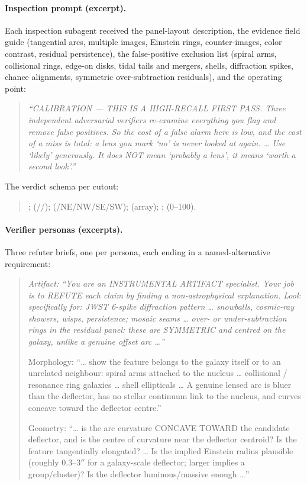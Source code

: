 \documentclass[11pt,letterpaper]{article}
\begin{document}
\paragraph{Inspection prompt (excerpt).} Each inspection subagent received
the panel-layout description, the evidence field guide (tangential arcs,
multiple images, Einstein rings, counter-images, color contrast, residual
persistence), the false-positive exclusion list (spiral arms, collisional
rings, edge-on disks, tidal tails and mergers, shells, diffraction spikes,
chance alignments, symmetric over-subtraction residuals), and the operating
point:
\begin{quote}\small\itshape
``CALIBRATION --- THIS IS A HIGH-RECALL FIRST PASS. Three independent
adversarial verifiers re-examine everything you flag and remove false
positives. So the cost of a false alarm here is low, and the cost of a miss
is total: a lens you mark `no' is never looked at again. \ldots{} Use
`likely' generously. It does NOT mean `probably a lens', it means `worth a
second look'.''
\end{quote}
The verdict schema per cutout:
\begin{quote}\raggedright\small
{};  (//);
 (/NE/NW/SE/SW);  (array);
;  (0--100).
\end{quote}

\paragraph{Verifier personas (excerpts).} Three refuter briefs, one per
persona, each ending in a named-alternative requirement:
\begin{quote}\small\itshape
Artifact: ``You are an INSTRUMENTAL ARTIFACT specialist. Your job is to
REFUTE each claim by finding a non-astrophysical explanation. Look
specifically for: JWST 6-spike diffraction pattern \ldots{} snowballs,
cosmic-ray showers, wisps, persistence; mosaic seams \ldots{} over- or
under-subtraction rings in the residual panel: these are SYMMETRIC and
centred on the galaxy, unlike a genuine offset arc \ldots''

Morphology: ``\ldots{} show the feature belongs to the galaxy itself or to an
unrelated neighbour: spiral arms attached to the nucleus \ldots{} collisional
/ resonance ring galaxies \ldots{} shell ellipticals \ldots{} A genuine
lensed arc is bluer than the deflector, has no stellar continuum link to the
nucleus, and curves concave toward the deflector centre.''

Geometry: ``\ldots{} is the arc curvature CONCAVE TOWARD the candidate
deflector, and is the centre of curvature near the deflector centroid? Is the
feature tangentially elongated? \ldots{} Is the implied Einstein radius
plausible (roughly 0.3--3$''$ for a galaxy-scale deflector; larger implies a
group/cluster)? Is the deflector luminous/massive enough \ldots''
\end{quote}
\end{document}
